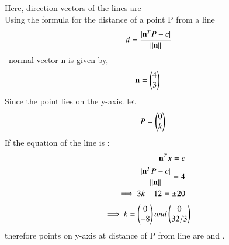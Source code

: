Here, direction vectors of the lines are
 \\
Using the formula for the distance of a point P from a line
\begin{align}
\ d &= \frac{|\mathbf{n}^TP-c|}{\left\lVert\mathbf{n}\right\rVert}
\end{align}
\ normal vector n is given by,
\begin{align}
\mathbf{n} &=\begin{pmatrix}4\\3\end{pmatrix}
\end{align}
Since the point lies on the y-axis. let
\begin{align}
\ P = \begin{pmatrix}0\\k\end{pmatrix}
\end{align}
If the equation of the line is :
\begin{align}
\mathbf{n}^Tx = c \\
\frac{|\mathbf{n}^TP-c|}{\left\lVert\mathbf{n}\right\rVert} = 4\\
\implies 3k - 12 = \pm 20 \\
\end{align}
\begin{align}
\implies k&= \begin{pmatrix}0\\-8\end{pmatrix} and 
\begin{pmatrix}0\\32/3\end{pmatrix}
\end{align}
therefore points on y-axis at distance of P from line are  and .
